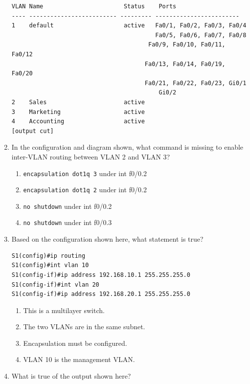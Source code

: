 \documentclass[b5paper,11pt]{memoir}
\begin{document}
\begin{enumerate}
\begin{verbatim}
VLAN Name                       Status    Ports
---- ------------------------- --------- ------------------------
1    default                    active   Fa0/1, Fa0/2, Fa0/3, Fa0/4
                                         Fa0/5, Fa0/6, Fa0/7, Fa0/8
                                       Fa0/9, Fa0/10, Fa0/11, Fa0/12
                                      Fa0/13, Fa0/14, Fa0/19, Fa0/20
                                      Fa0/21, Fa0/22, Fa0/23, Gi0/1
                                          Gi0/2
2    Sales                      active
3    Marketing                  active
4    Accounting                 active
[output cut]
\end{verbatim}
\item
  In the configuration and diagram shown, what command is missing to
  enable inter-VLAN routing between VLAN 2 and VLAN 3?

  \begin{figure}
  \centering
  \caption{}
  \end{figure}

  \begin{enumerate}
  \tightlist
  \item
    \texttt{encapsulation\ dot1q\ 3} under int f0/0.2
  \item
    \texttt{encapsulation\ dot1q\ 2} under int f0/0.2
  \item
    \texttt{no\ shutdown} under int f0/0.2
  \item
    \texttt{no\ shutdown} under int f0/0.3
  \end{enumerate}
\item
   Based on the
  configuration shown here, what statement is true?

\begin{verbatim}
S1(config)#ip routing
S1(config)#int vlan 10
S1(config-if)#ip address 192.168.10.1 255.255.255.0
S1(config-if)#int vlan 20
S1(config-if)#ip address 192.168.20.1 255.255.255.0
\end{verbatim}

  \begin{enumerate}
  \tightlist
  \item
    This is a multilayer switch.
  \item
    The two VLANs are in the same subnet.
  \item
    Encapsulation must be configured.
  \item
    VLAN 10 is the management VLAN.
  \end{enumerate}
\item
  What is true of the output shown here?


\end{enumerate}
\end{document}

